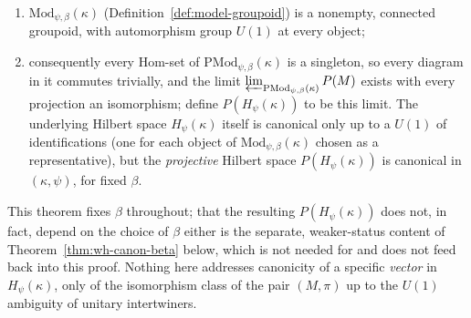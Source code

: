 \statusProved
\begin{theorem}
\label{thm:wh-canon}
\begin{enumerate}[label=(\alph*)]
\item $\mathrm{Mod}_{\psi,\beta}(\kappa)$ (Definition~\ref{def:model-groupoid})
is a nonempty, connected groupoid, with automorphism group $U(1)$ at every
object;
\item consequently every $\mathrm{Hom}$-set of $\mathrm{PMod}_{\psi,\beta}(\kappa)$
is a singleton, so every diagram in it commutes trivially, and the limit
$\varprojlim_{\mathrm{PMod}_{\psi,\beta}(\kappa)} P(M)$ exists with every
projection an isomorphism; define $P(H_\psi(\kappa))$ to be this limit. The
underlying Hilbert space $H_\psi(\kappa)$ itself is canonical only up to a
$U(1)$ of identifications (one for each object of
$\mathrm{Mod}_{\psi,\beta}(\kappa)$ chosen as a representative), but the
\emph{projective} Hilbert space $P(H_\psi(\kappa))$ is canonical in
$(\kappa,\psi)$, for fixed $\beta$.
\end{enumerate}
\end{theorem}

\begin{scope}
This theorem fixes $\beta$ throughout; that the resulting
$P(H_\psi(\kappa))$ does not, in fact, depend on the choice of $\beta$
either is the separate, weaker-status content of
Theorem~\ref{thm:wh-canon-beta} below, which is not needed for and does not
feed back into this proof. Nothing here addresses canonicity of a specific
\emph{vector} in $H_\psi(\kappa)$, only of the isomorphism class of the pair
$(M,\pi)$ up to the $U(1)$ ambiguity of unitary intertwiners.
\end{scope}



